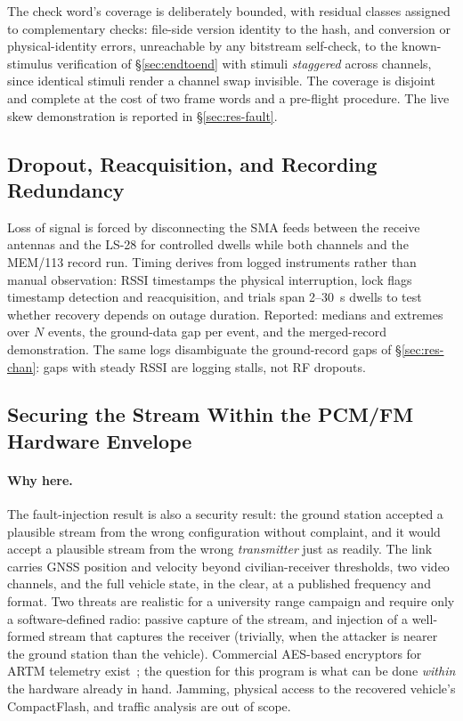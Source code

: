 \documentclass[12pt,letterpaper]{article}
\begin{document}
The check word's coverage is deliberately bounded, with residual classes assigned to
complementary checks: file-side version identity to the hash, and conversion or
physical-identity errors, unreachable by any bitstream self-check, to the known-stimulus
verification of \S\ref{sec:endtoend} with stimuli \emph{staggered} across channels, since
identical stimuli render a channel swap invisible. The coverage is disjoint and complete at
the cost of two frame words and a pre-flight procedure. The live skew demonstration is
reported in \S\ref{sec:res-fault}.

\subsection{Dropout, Reacquisition, and Recording Redundancy}\label{sec:dropout}

Loss of signal is forced by disconnecting the SMA feeds between the receive antennas and the
LS-28 for controlled dwells while both channels and the MEM/113 record run. Timing derives
from logged instruments rather than manual observation: RSSI timestamps the physical
interruption, lock flags timestamp detection and reacquisition, and trials span 2--30~s
dwells to test whether recovery depends on outage duration. Reported: medians and extremes
over $N$ events, the ground-data gap per event, and the merged-record demonstration. The
same logs disambiguate the ground-record gaps of \S\ref{sec:res-chan}: gaps with steady RSSI
are logging stalls, not RF dropouts.

\subsection{Securing the Stream Within the PCM/FM Hardware Envelope}\label{sec:security}

\paragraph{Why here.}
The fault-injection result is also a security result: the ground station accepted a
plausible stream from the wrong configuration without complaint, and it would accept a
plausible stream from the wrong \emph{transmitter} just as readily. The link carries GNSS
position and velocity beyond civilian-receiver thresholds, two video channels, and the
full vehicle state, in the clear, at a published frequency and format. Two threats are
realistic for a university range campaign and require only a software-defined radio:
passive capture of the stream, and injection of a well-formed stream that captures the
receiver (trivially, when the attacker is nearer the ground station than the vehicle).
Commercial AES-based encryptors for ARTM telemetry exist~\cite{cook2021}; the question for
this program is what can be done \emph{within} the hardware already in hand. Jamming,
physical access to the recovered vehicle's CompactFlash, and traffic analysis are out of
scope.
\end{document}
